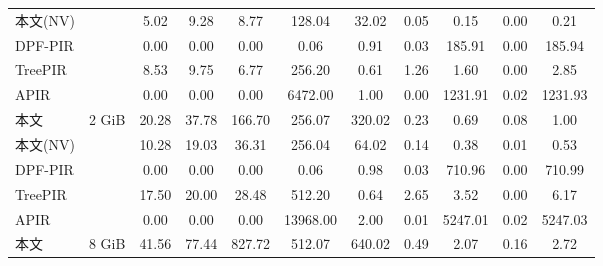 \begin{table}[]
\begin{tabular}{@{}lc|ccc|cccccc@{}}
        本文(NV) &                           & 5.02                         & 9.28                       & 8.77    & 128.04                        & \multicolumn{1}{c|}{32.02}   & 0.05  & 0.15     & 0.00        & 0.21     \\
        DPF-PIR       &                           & 0.00                         & 0.00                       & 0.00    & 0.06                          & \multicolumn{1}{c|}{0.91}    & 0.03  & 185.91   & 0.00        & 185.94   \\
        TreePIR   &                           & 8.53                         & 9.75                       & 6.77    & 256.20                        & \multicolumn{1}{c|}{0.61}    & 1.26  & 1.60     & 0.00        & 2.85     \\
        APIR      &                           & 0.00                         & 0.00                       & 0.00    & 6472.00                       & \multicolumn{1}{c|}{1.00}    & 0.00  & 1231.91  & 0.02        & 1231.93  \\ \midrule
        本文     & \multirow{5}{*}{2 GiB}   & 20.28                        & 37.78                      & 166.70  & 256.07                        & \multicolumn{1}{c|}{320.02}  & 0.23  & 0.69     & 0.08        & 1.00     \\
        本文(NV) &                           & 10.28                        & 19.03                      & 36.31   & 256.04                        & \multicolumn{1}{c|}{64.02}   & 0.14  & 0.38     & 0.01        & 0.53     \\
        DPF-PIR       &                           & 0.00                         & 0.00                       & 0.00    & 0.06                          & \multicolumn{1}{c|}{0.98}    & 0.03  & 710.96   & 0.00        & 710.99   \\
        TreePIR   &                           & 17.50                        & 20.00                      & 28.48   & 512.20                        & \multicolumn{1}{c|}{0.64}    & 2.65  & 3.52     & 0.00        & 6.17     \\
        APIR      &                           & 0.00                         & 0.00                       & 0.00    & 13968.00                      & \multicolumn{1}{c|}{2.00}    & 0.01  & 5247.01  & 0.02        & 5247.03  \\ \midrule
        本文     & \multirow{5}{*}{8 GiB}   & 41.56                        & 77.44                      & 827.72  & 512.07                        & \multicolumn{1}{c|}{640.02}  & 0.49  & 2.07     & 0.16        & 2.72     \\

\end{tabular}
\end{table}
